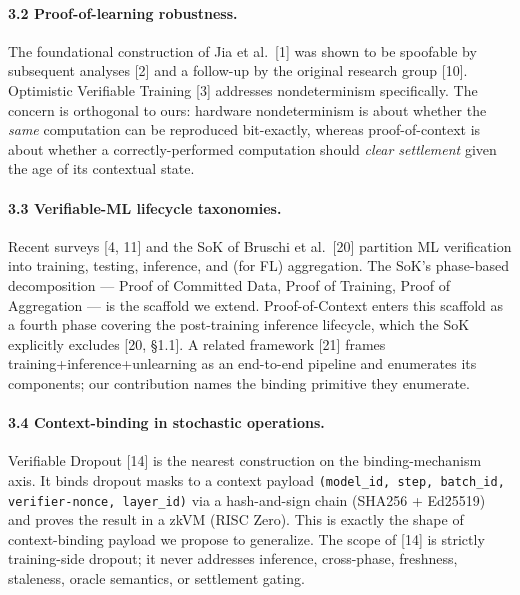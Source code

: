 \documentclass[11pt]{article}
\begin{document}
\paragraph{3.2 Proof-of-learning robustness.} The foundational construction of Jia et al.\ [1] was shown to be spoofable by subsequent analyses [2] and a follow-up by the original research group [10]. Optimistic Verifiable Training [3] addresses nondeterminism specifically. The concern is orthogonal to ours: hardware nondeterminism is about whether the \emph{same} computation can be reproduced bit-exactly, whereas proof-of-context is about whether a correctly-performed computation should \emph{clear settlement} given the age of its contextual state.

\paragraph{3.3 Verifiable-ML lifecycle taxonomies.} Recent surveys [4, 11] and the SoK of Bruschi et al.\ [20] partition ML verification into training, testing, inference, and (for FL) aggregation. The SoK's phase-based decomposition --- Proof of Committed Data, Proof of Training, Proof of Aggregation --- is the scaffold we extend. Proof-of-Context enters this scaffold as a fourth phase covering the post-training inference lifecycle, which the SoK explicitly excludes [20, \S1.1]. A related framework [21] frames training+inference+unlearning as an end-to-end pipeline and enumerates its components; our contribution names the binding primitive they enumerate.

\paragraph{3.4 Context-binding in stochastic operations.} Verifiable Dropout [14] is the nearest construction on the binding-mechanism axis. It binds dropout masks to a context payload \texttt{(model\_id, step, batch\_id, verifier-nonce, layer\_id)} via a hash-and-sign chain (SHA256 + Ed25519) and proves the result in a zkVM (RISC Zero). This is exactly the shape of context-binding payload we propose to generalize. The scope of [14] is strictly training-side dropout; it never addresses inference, cross-phase, freshness, staleness, oracle semantics, or settlement gating.
\end{document}
